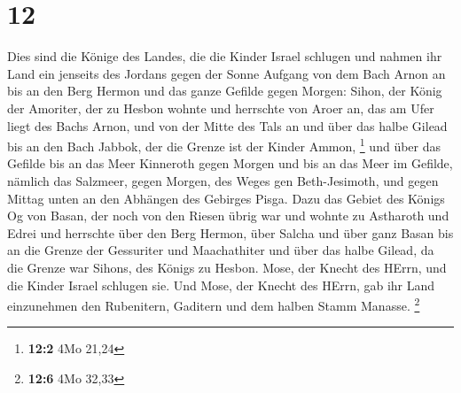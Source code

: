 \hypertarget{section-4}{%
\section{12}\label{section-4}}

 Dies sind die Könige des Landes, die die Kinder Israel
schlugen und nahmen ihr Land ein jenseits des Jordans gegen der Sonne
Aufgang von dem Bach Arnon an bis an den Berg Hermon und das ganze
Gefilde gegen Morgen:  Sihon, der König der Amoriter, der zu
Hesbon wohnte und herrschte von Aroer an, das am Ufer liegt des Bachs
Arnon, und von der Mitte des Tals an und über das halbe Gilead bis an
den Bach Jabbok, der die Grenze ist der Kinder Ammon, \footnote{\textbf{12:2}
  4Mo 21,24}  und über das Gefilde bis an das Meer Kinneroth
gegen Morgen und bis an das Meer im Gefilde, nämlich das Salzmeer, gegen
Morgen, des Weges gen Beth-Jesimoth, und gegen Mittag unten an den
Abhängen des Gebirges Pisga.  Dazu das Gebiet des Königs Og
von Basan, der noch von den Riesen übrig war und wohnte zu Astharoth und
Edrei  und herrschte über den Berg Hermon, über Salcha und
über ganz Basan bis an die Grenze der Gessuriter und Maachathiter und
über das halbe Gilead, da die Grenze war Sihons, des Königs zu Hesbon.
 Mose, der Knecht des HErrn, und die Kinder Israel schlugen
sie. Und Mose, der Knecht des HErrn, gab ihr Land einzunehmen den
Rubenitern, Gaditern und dem halben Stamm Manasse. \footnote{\textbf{12:6}
  4Mo 32,33}

